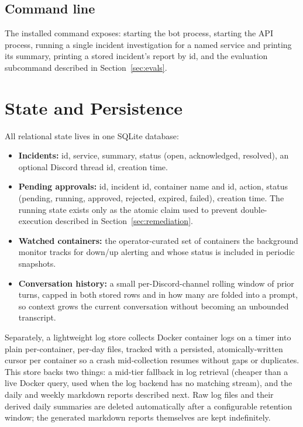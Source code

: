 \documentclass[11pt]{article}
\begin{document}
\subsection{Command line}

The installed command exposes: starting the bot process, starting the API
process, running a single incident investigation for a named service and
printing its summary, printing a stored incident's report by id, and the
evaluation subcommand described in Section~\ref{sec:evals}.

\section{State and Persistence}

All relational state lives in one SQLite database:

\begin{itemize}
  \item \textbf{Incidents:} id, service, summary, status (open,
    acknowledged, resolved), an optional Discord thread id, creation time.
  \item \textbf{Pending approvals:} id, incident id, container name and
    id, action, status (pending, running, approved, rejected, expired,
    failed), creation time. The running state exists only as the atomic
    claim used to prevent double-execution described in
    Section~\ref{sec:remediation}.
  \item \textbf{Watched containers:} the operator-curated set of containers
    the background monitor tracks for down/up alerting and whose status is
    included in periodic snapshots.
  \item \textbf{Conversation history:} a small per-Discord-channel rolling
    window of prior turns, capped in both stored rows and in how many are
    folded into a prompt, so context grows the current conversation without
    becoming an unbounded transcript.
\end{itemize}

Separately, a lightweight log store collects Docker container logs on a
timer into plain per-container, per-day files, tracked with a persisted,
atomically-written cursor per container so a crash mid-collection resumes
without gaps or duplicates. This store backs two things: a mid-tier
fallback in log retrieval (cheaper than a live Docker query, used when the
log backend has no matching stream), and the daily and weekly markdown
reports described next. Raw log files and their derived daily summaries are
deleted automatically after a configurable retention window; the generated
markdown reports themselves are kept indefinitely.
\end{document}
